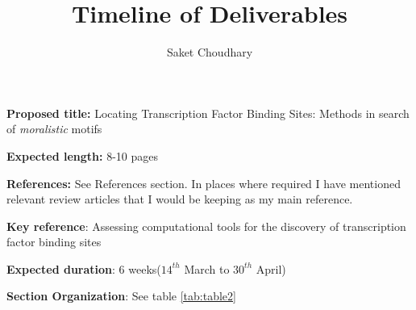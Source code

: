 \documentclass[a4paper,11pt]{article}
\title{Timeline of Deliverables}
\author{Saket Choudhary}
\begin{document}
\maketitle

\textbf{Proposed title:} {Locating Transcription Factor Binding Sites: Methods in search of \textit{moralistic} motifs} 

\textbf{Expected length:} 8-10 pages

\textbf{References: } See References section. In places where required I have mentioned relevant review articles that I would be keeping as my main reference.

\textbf{Key reference}: Assessing computational tools for the
discovery of transcription factor binding sites \cite{tompa_assessing_2005}

\textbf{Expected duration}: 6 weeks($14^{th}$ March to $30^{th}$ April)

\textbf{Section Organization}: See table \ref{tab:table2}


\newpage
\end{document}
